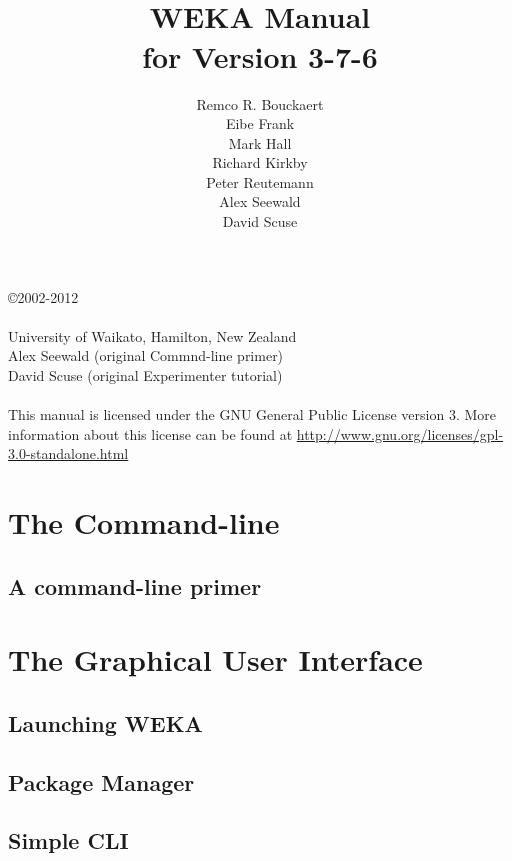\documentclass[a4paper]{book}
\title{\epsfig{file=images/coat_of_arms.eps,width=10cm}\vspace{3cm}\\WEKA Manual\\for Version 3-7-6}
\author{Remco R. Bouckaert\\Eibe Frank\\Mark Hall\\Richard Kirkby\\Peter Reutemann\\Alex Seewald\\David Scuse}
\begin{document}
\begin{titlepage}
\maketitle

\thispagestyle{empty}
\center
\begin{table}[b]
\copyright 2002-2012 \\
 \\
University of Waikato, Hamilton, New Zealand \\
Alex Seewald (original Commnd-line primer) \\
David Scuse (original Experimenter tutorial) \\
\\
This manual is licensed under the GNU General Public License version 3. More information about this license can be found at \url{http://www.gnu.org/licenses/gpl-3.0-standalone.html}
\end{table}

\end{titlepage}

\tableofcontents

\part{The Command-line}

\chapter{A command-line primer}


\part{The Graphical User Interface}

\chapter{Launching WEKA}


\chapter{Package Manager}


\chapter{Simple CLI}

\end{document}
